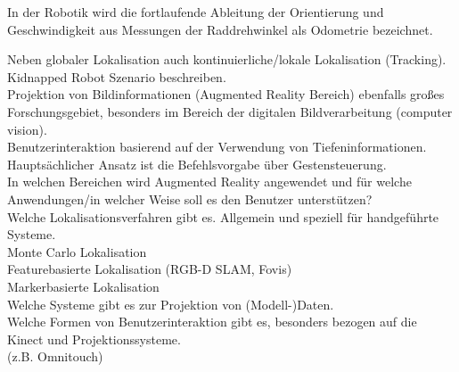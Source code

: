 In der Robotik wird die fortlaufende Ableitung der Orientierung und Geschwindigkeit aus Messungen der Raddrehwinkel als Odometrie bezeichnet. \cite{Hertzberg2012}

Neben globaler Lokalisation auch kontinuierliche/lokale Lokalisation (Tracking). Kidnapped Robot Szenario beschreiben.\\

Projektion von Bildinformationen (Augmented Reality Bereich) ebenfalls großes Forschungsgebiet, besonders im Bereich der digitalen Bildverarbeitung (computer vision).\\

Benutzerinteraktion basierend auf der Verwendung von Tiefeninformationen. Hauptsächlicher Ansatz ist die Befehlsvorgabe über Gestensteuerung.\\
In welchen Bereichen wird Augmented Reality angewendet und für welche Anwendungen/in welcher Weise soll es den Benutzer unterstützen?\\


Welche Lokalisationsverfahren gibt es. Allgemein und speziell für handgeführte Systeme.\\
Monte Carlo Lokalisation\\
Featurebasierte Lokalisation (RGB-D SLAM, Fovis)\\
Markerbasierte Lokalisation\\

Welche Systeme gibt es zur Projektion von (Modell-)Daten.\\


Welche Formen von Benutzerinteraktion gibt es, besonders bezogen auf die Kinect und Projektionssysteme.\\
(z.B. Omnitouch)